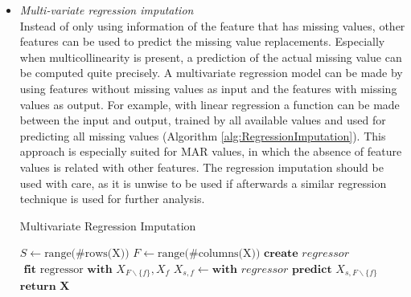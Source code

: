 \documentclass[10pt,a4paper]{report}
\begin{document}
\begin{itemize}
		\item \textit{Multi-variate regression imputation} \\
		Instead of only using information of the feature that has missing values, other features can be used to predict the missing value replacements. Especially when multicollinearity is present, a prediction of the actual missing value can be computed quite precisely. A multivariate regression model can be made by using features without missing values as input and the features with missing values as output. For example, with linear regression a function can be made between the input and output, trained by all available values and used for predicting all missing values (Algorithm \ref{alg:RegressionImputation})\cite{raghunathan2001multivariate}. This approach is especially suited for MAR values, in which the absence of feature values is related with other features. The regression imputation should be used with care, as it is unwise to be used if afterwards a similar regression technique is used for further analysis\cite{donders2006gentle}.
		
		\begin{algorithm}[H]
			\caption{Multivariate Regression Imputation}\label{alg:RegressionImputation}
			\begin{algorithmic}[1]
				\State $S \gets \text{range(\#rows(X))}$ 	
				\State $F \gets \text{range(\#columns(X))}$ 	
				 					
				 				 			
				\State $\textbf{create } \textit{regressor}$	
				\State $\textbf{ fit } \text{regressor} \textbf{ with } X_{F \backslash\{f\}}, X_f$	
				 
				 
				\State $X_{s,f} \gets \textbf{with }\textit{regressor} \textbf{ predict } X_{s, F \backslash \{f\}}$ 
				\EndIf
				\EndFor
				\EndIf
				\EndFor
				\State $\textbf{return X}$
				\EndProcedure
			\end{algorithmic}
		\end{algorithm}	
		

\end{itemize}
\end{document}
